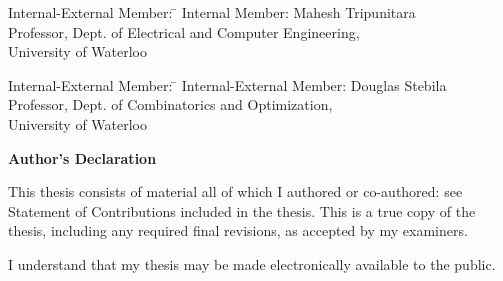   \noindent
  \begin{tabbing}
Internal-External Member: \=  \kill %
Internal Member: \>  Mahesh Tripunitara  \\
\> Professor, Dept. of Electrical and Computer Engineering,\\
\> University of Waterloo \\
\end{tabbing}
  \bigskip

  
  \noindent
\begin{tabbing}
Internal-External Member: \=  \kill %
Internal-External Member: \>  Douglas Stebila  \\
\> Professor, Dept. of Combinatorics and Optimization,\\ \> University of Waterloo \\
\end{tabbing}
  \bigskip
  

\cleardoublepage
{}    %

 \begin{center}\textbf{Author's Declaration}\end{center}

 \noindent
 \noindent  
This thesis consists of material all of which I authored or co-authored: see Statement of Contributions included in the thesis. This is a true copy of the thesis, including any required final revisions, as accepted by my examiners.
  \bigskip
  
  \noindent
I understand that my thesis may be made electronically available to the public.


